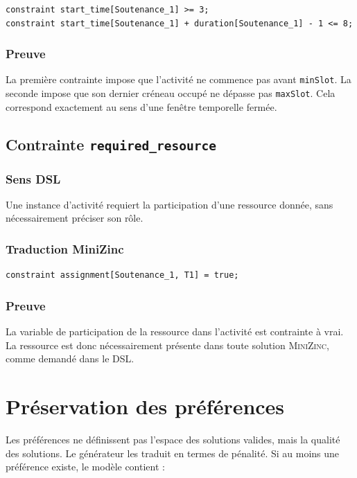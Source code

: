 \documentclass[12pt,a4paper]{article}
\newcommand{\MZN}{\textsc{MiniZinc}}
\begin{document}
\begin{lstlisting}[language=MiniZinc]
constraint start_time[Soutenance_1] >= 3;
constraint start_time[Soutenance_1] + duration[Soutenance_1] - 1 <= 8;
\end{lstlisting}

\subsubsection*{Preuve}

La première contrainte impose que l'activité ne commence pas avant \texttt{minSlot}. La seconde impose que son dernier créneau occupé ne dépasse pas \texttt{maxSlot}. Cela correspond exactement au sens d'une fenêtre temporelle fermée.

\subsection{Contrainte \texttt{required\_resource}}

\subsubsection*{Sens DSL}

Une instance d'activité requiert la participation d'une ressource donnée, sans nécessairement préciser son rôle.

\subsubsection*{Traduction MiniZinc}

\begin{lstlisting}[language=MiniZinc]
constraint assignment[Soutenance_1, T1] = true;
\end{lstlisting}

\subsubsection*{Preuve}

La variable de participation de la ressource dans l'activité est contrainte à vrai. La ressource est donc nécessairement présente dans toute solution \MZN{}, comme demandé dans le DSL.

\section{Préservation des préférences}

Les préférences ne définissent pas l'espace des solutions valides, mais la qualité des solutions. Le générateur les traduit en termes de pénalité. Si au moins une préférence existe, le modèle contient :
\end{document}
